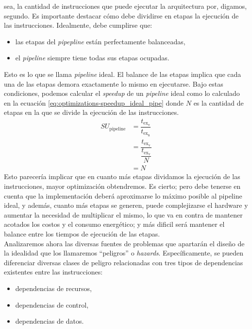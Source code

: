 sea, la cantidad de instrucciones que puede ejecutar la arquitectura por, 
digamos, segundo. Es importante destacar cómo debe dividirse en etapas la 
ejecución de las instrucciones. Idealmente, debe cumplirse que:
\begin{itemize}
  \item las etapas del \emph{pipepline} están perfectamente balanceadas,
  \item el \emph{pipeline} siempre tiene todas sus etapas ocupadas.
\end{itemize}
Esto es lo que se llama \emph{pipeline} ideal. El balance de las etapas implica 
que cada una de las etapas demora exactamente lo mismo en ejecutarse. Bajo 
estas condiciones, podemos calcular el \emph{speedup} de un \emph{pipeline} 
ideal como lo calculado en la ecuación 
\ref{eq:optimizations-speedup_ideal_pipe} 
donde $N$ es la cantidad de etapas en la que se divide la ejecución de las 
instrucciones. 
\begin{equation}
  \label{eq:optimizations-speedup_ideal_pipe}
  \begin{split}
    SU_{\text{pipeline}} & = 
\dfrac{ t_{\text{ex}_{\text{v}}} } { t_{\text{ex}_\text{n}} }\\
    & = \dfrac{ t_{\text{ex}_{\text{v}}} } { \dfrac{ t_{\text{ex}_{\text{v}}} } 
{ N } }\\
    & = N
  \end{split}
\end{equation}
Esto parecería implicar que en cuanto más etapas dividamos la ejecución de las 
instrucciones, mayor optimización obtendremos. Es cierto; pero debe tenerse en 
cuenta que la implementación deberá aproximarse lo máximo posible al pipeline 
ideal, y además, cuanto más etapas se generen, puede complejizarse el hardware 
y aumentar la necesidad de multiplicar el mismo, lo que va en contra de 
mantener acotados los costos y el consumo energético; y más dificil será 
mantener el balance entre los tiempos de ejecución de las etapas.\\
Analizaremos ahora las diversas fuentes de problemas que apartarán el diseño de 
la idealidad que los llamaremos ``peligros'' o \emph{hazards}. Específicamente, 
se pueden diferenciar diversas clases de peligro relacionadas con tres tipos de 
dependencias existentes entre las instrucciones:
\begin{itemize}
  \item dependencias de recursos,
  \item dependencias de control,
  \item dependencias de datos.
\end{itemize}

